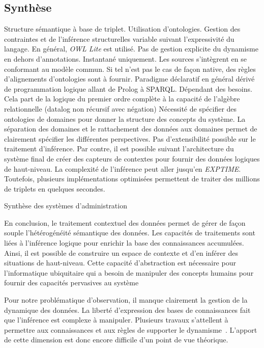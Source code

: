\subsection{Synthèse}
\begin{table}[!ht]
\criteretabDonnee
    {Structure sémantique à base de triplet.}
    {Utilisation d'ontologies. Gestion des contraintes et de l'inférence structurelles variable suivant l'expressivité du langage. En général, \textit{OWL Lite} est utilisé.}
    {Pas de gestion explicite du dynamisme en dehors d'annotations.}
\criteretabTraitement
    {Instantané uniquement.}
    {Les sources s'intègrent en se conformant au modèle commun. Si tel n'est pas le cas de façon native, des règles d'alignements d'ontologies sont à fournir.}
    {Paradigme déclaratif en général dérivé de programmation logique allant de Prolog à SPARQL.}
    {Dépendant des besoins. Cela part de la logique du premier ordre complète à la capacité de l'algèbre relationnelle (datalog non récursif avec négation)}
\criteretabAdaptabilite
    {Nécessité de spécifier des ontologies de domaines pour donner la structure des concepts du système.}
    {La séparation des domaines et le rattachement des données aux domaines permet de clairement spécifier les différentes perspectives.}
    {Pas d'extensibilité possible sur le traitement d'inférence. Par contre, il est possible suivant l'architecture du système final de créer des capteurs de contextes pour fournir des données logiques de haut-niveau.}
    {La complexité de l'inférence peut aller jusqu'en \textit{EXPTIME}. Toutefois, plusieurs implémentations optimisées permettent de traiter des millions de triplets en quelques secondes.}
\caption{Synthèse des systèmes d'administration}\label{tab:rw:supervision:contexte:synthese}
\end{table}
En conclusion, le traitement contextuel des données permet de gérer de façon souple l'hétérogénéité sémantique des données. Les capacités de traitements sont liées à l'inférence logique pour enrichir la base des connaissances accumulées. Ainsi, il est possible de construire un espace de contexte et d'en inférer des situations de haut-niveau. Cette capacité d'abstraction est nécessaire pour l'informatique ubiquitaire qui a besoin de manipuler des concepts humains pour fournir des capacités pervasives au système

Pour notre problématique d'observation, il manque clairement la gestion de la dynamique des données. La liberté d'expression des bases de connaissances fait que l'inférence est complexe à manipuler. Plusieurs travaux s’attellent à permettre aux connaissances et aux règles de supporter le dynamisme~\cite{Weikum:webknowledge, Hellerstein:declarative}. L'apport de cette dimension est donc encore difficile d'un point de vue théorique.